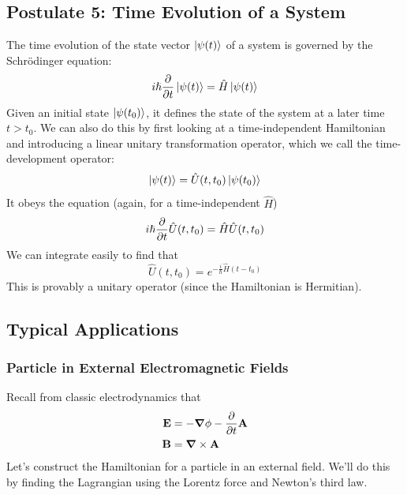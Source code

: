 \documentclass[a4paper]{article}
\begin{document}
\subsection{Postulate 5: Time Evolution of a System}
The time evolution of the state vector $\left\lvert \psi(t)\right\rangle$ of a system is
governed by the Schr\"odinger equation:
\[ i\hslash\pd{t}\bket{\psi(t)} = \hat{H}\bket{\psi(t)} \]
Given an initial state $\left\lvert \psi(t_0)\right\rangle$, it defines the state of the system
at a later time $t > t_0$.
We can also do this by first looking at a time-independent Hamiltonian and
introducing a linear unitary transformation operator, which we call the
time-development operator:
\[ \left\lvert \psi(t)\right\rangle = \hat{U}(t,t_0)\left\lvert \psi(t_0)\right\rangle \]
It obeys the equation (again, for a time-independent $\hat{H}$)
\[ i\hslash\pd{t}\hat{U}(t,t_0) = \hat{H}\hat{U}(t,t_0) \]
We can integrate easily to find that
\[ \hat{U}(t,t_0) = e^{-\frac{i}{\hslash}\hat{H}(t-t_0)} \]
This is provably a unitary operator (since the Hamiltonian is Hermitian).

\subsection{Typical Applications}
\subsubsection{Particle in External Electromagnetic Fields}
Recall from classic electrodynamics that
\begin{align*}
	\vec{E} &= -\del\phi-\pd{t}\vec{A}\\
	\vec{B} &= \del\times\vec{A}
\end{align*}
Let's construct the Hamiltonian for a particle in an external field. We'll do
this by finding the Lagrangian using the Lorentz force and Newton's third law.
\end{document}
